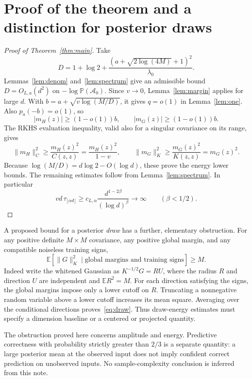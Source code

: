 \documentclass[11pt]{article}
\newcommand{\E}{\mathbb E}
\newcommand{\Pp}{\mathbb P}
\begin{document}
\section{Proof of the theorem and a distinction for posterior draws}
\begin{proof}[Proof of Theorem~\ref{thm:main}]
Take
\[
 D=1+\log2+\frac{(a+\sqrt{2\log(4M)}+1)^2}{\lambda_0}.
\]
Lemmas~\ref{lem:denom} and~\ref{lem:spectrum} give an admissible bound $D=O_{L,a}(d^2)$ on $-\log\Pp(\mathcal A_0)$.
Since $v\to0$, Lemma~\ref{lem:margin} applies for large $d$. With
$b=a+\sqrt{v\log(M/D)}$, it gives $q=o(1)$ in Lemma~\ref{lem:one}.
Also $p_a(-b)=o(1)$, so
\[
 |m_H(z)|\ge(1-o(1))b,\qquad |m_G(z)|\ge(1-o(1))b.
\]
The RKHS evaluation inequality, valid also for a singular covariance on its range, gives
\[
 \|m_H\|_C^2\ge\frac{m_H(z)^2}{C(z,z)}
 =\frac{m_H(z)^2}{1-v},\qquad
 \|m_G\|_K^2\ge\frac{m_G(z)^2}{K(z,z)}=m_G(z)^2.
\]
Because $\log(M/D)=d\log2-O(\log d)$, these prove the energy lower bounds.
The remaining estimates follow from Lemma~\ref{lem:spectrum}. In particular
\[
 v d\,\tau_{\lfloor\alpha d\rfloor}
 \ge c_{L,\alpha}\frac{d^{1-2\beta}}{(\log d)^\beta}
 \longrightarrow\infty\qquad(\beta<1/2).
\]
\end{proof}

A proposed bound for a posterior \emph{draw} has a further, elementary obstruction. For any positive definite $M\times M$ covariance, any positive global margin, and any compatible noiseless training signs,
\begin{equation}\label{eq:draw}
 \E[\|G\|_K^2\mid\text{global margins and training signs}]\ge M.
\end{equation}
Indeed write the whitened Gaussian as $K^{-1/2}G=RU$, where the radius $R$ and direction $U$ are independent and $\E R^2=M$. For each direction satisfying the signs, the global margins impose only a lower cutoff on $R$. Truncating a nonnegative random variable above a lower cutoff increases its mean square. Averaging over the conditional directions proves~\eqref{eq:draw}. Thus draw-energy estimates must specify a dimension baseline or a centered or projected quantity.

The obstruction proved here concerns amplitude and energy. Predictive correctness with probability strictly greater than $2/3$ is a separate quantity: a large posterior mean at the observed input does not imply confident correct prediction on unobserved inputs. No sample-complexity conclusion is inferred from this note.
\end{document}
